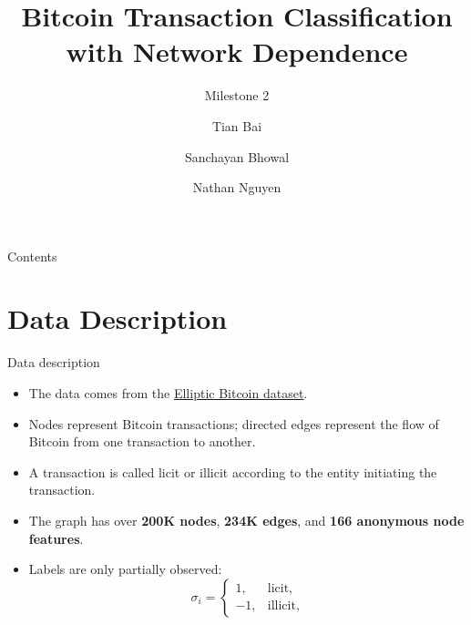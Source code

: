 \documentclass[aspectratio=169]{beamer}
\title[Milestone 2]{Bitcoin Transaction Classification with Network Dependence}
\subtitle{Milestone 2}
\author[T. Bai \and S. Bhowal \and N. Nguyen]{Tian Bai \and Sanchayan Bhowal \and Nathan Nguyen}
\date{}
\begin{document}
\begin{frame}
  \titlepage
\end{frame}

\begin{frame}{Contents}
    \tableofcontents
\end{frame}

\section{Data Description}
\begin{frame}{Data description}
\begin{itemize}
    \item The data comes from the \href{https://pytorch-geometric.readthedocs.io/en/stable/generated/torch_geometric.datasets.EllipticBitcoinDataset.html}{Elliptic Bitcoin dataset}.
    \item Nodes represent Bitcoin transactions; directed edges represent the flow of Bitcoin from one transaction to another.
    \item A transaction is called \alert{licit} or \alert{illicit} according to the entity initiating the transaction.
    \item The graph has over \textbf{200K nodes}, \textbf{234K edges}, and \textbf{166 anonymous node features}.
    \item Labels are only partially observed:
    \[
        \sigma_i = \begin{cases}
            1, & \text{licit},\\
            -1, & \text{illicit},
        \end{cases}
    \]
\end{itemize}
\end{frame}
\end{document}
